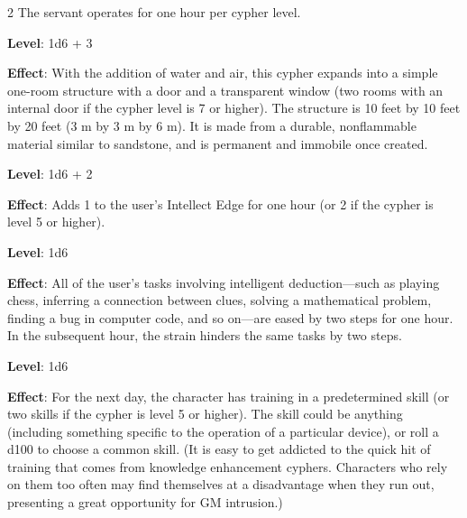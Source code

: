 \begin{multicols}{2}
The servant operates for one hour per cypher level.


\textbf{Level}: 1d6 + 3

\textbf{Effect}: With the addition of water and air, this cypher expands into a simple one-room structure with a door and a transparent window (two rooms with an internal door if the cypher level is 7 or higher). The structure is 10 feet by 10 feet by 20 feet (3 m by 3 m by 6 m). It is made from a durable, nonflammable material similar to sandstone, and is permanent and immobile once created.


\textbf{Level}: 1d6 + 2

\textbf{Effect}: Adds 1 to the user’s Intellect Edge for one hour (or 2 if the cypher is level 5 or higher).


\textbf{Level}: 1d6

\textbf{Effect}: All of the user’s tasks involving intelligent deduction—such as playing chess, inferring a connection between clues, solving a mathematical problem, finding a bug in computer code, and so on—are eased by two steps for one hour. In the subsequent hour, the strain hinders the same tasks by two steps.


\textbf{Level}: 1d6

\textbf{Effect}: For the next day, the character has training in a predetermined skill (or two skills if the cypher is level 5 or higher). The skill could be anything (including something specific to the operation of a particular device), or roll a d100 to choose a common skill. (It is easy to get addicted to the quick hit of training that comes from knowledge enhancement cyphers. Characters who rely on them too often may find themselves at a disadvantage when they run out, presenting a great opportunity for GM intrusion.)

\end{multicols}

